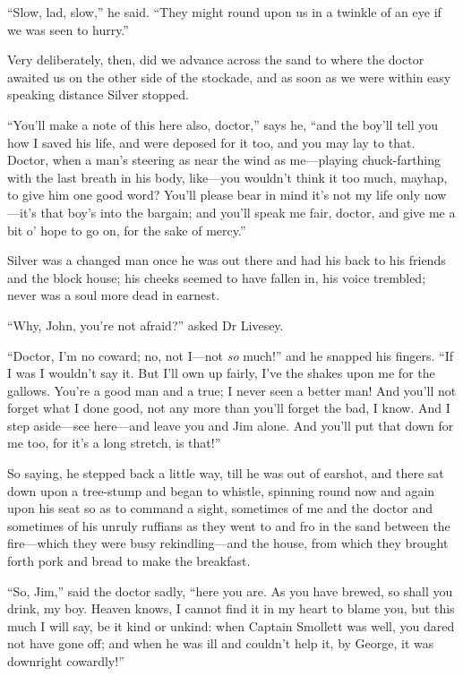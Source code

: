 \enquote{Slow, lad, slow,} he said. \enquote{They might round upon us in a twinkle of an eye if we was seen to hurry.}

Very deliberately, then, did we advance across the sand to where the doctor awaited us on the other side of the stockade, and as soon as we were within easy speaking distance Silver stopped.

\enquote{You’ll make a note of this here also, doctor,} says he, \enquote{and the boy’ll tell you how I saved his life, and were deposed for it too, and you may lay to that. Doctor, when a man’s steering as near the wind as me---playing chuck-farthing with the last breath in his body, like---you wouldn’t think it too much, mayhap, to give him one good word? You’ll please bear in mind it’s not my life only now---it’s that boy’s into the bargain; and you’ll speak me fair, doctor, and give me a bit o’ hope to go on, for the sake of mercy.}

Silver was a changed man once he was out there and had his back to his friends and the block house; his cheeks seemed to have fallen in, his voice trembled; never was a soul more dead in earnest.

\enquote{Why, John, you’re not afraid?} asked Dr Livesey.

\enquote{Doctor, I’m no coward; no, not I---not \textit{so} much!} and he snapped his fingers. \enquote{If I was I wouldn’t say it. But I’ll own up fairly, I’ve the shakes upon me for the gallows. You’re a good man and a true; I never seen a better man! And you’ll not forget what I done good, not any more than you’ll forget the bad, I know. And I step aside---see here---and leave you and Jim alone. And you’ll put that down for me too, for it’s a long stretch, is that!}

So saying, he stepped back a little way, till he was out of earshot, and there sat down upon a tree-stump and began to whistle, spinning round now and again upon his seat so as to command a sight, sometimes of me and the doctor and sometimes of his unruly ruffians as they went to and fro in the sand between the fire---which they were busy rekindling---and the house, from which they brought forth pork and bread to make the breakfast.

\enquote{So, Jim,} said the doctor sadly, \enquote{here you are. As you have brewed, so shall you drink, my boy. Heaven knows, I cannot find it in my heart to blame you, but this much I will say, be it kind or unkind: when Captain Smollett was well, you dared not have gone off; and when he was ill and couldn’t help it, by George, it was downright cowardly!}

